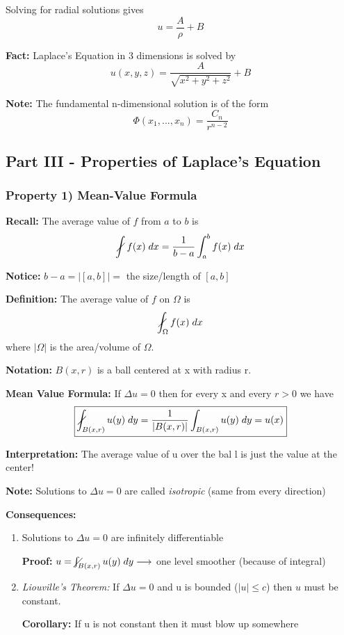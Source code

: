 \documentclass[12pt]{article}
\newcommand{\slashedint}{\diagup \!\!\!\!\!\!\! \int}
\begin{document}
Solving for radial solutions gives 
\[u = \frac{A}{\rho} + B\]

\textbf{Fact:} Laplace's Equation in 3 dimensions is solved by 
\[\boxed{u(x, y, z) = \frac{A}{\sqrt{x^2 + y^2 + z^2}} + B}\]

\textbf{Note:} The fundamental n-dimensional solution is of the form 
\[\Phi(x_1, ..., x_n) = \frac{C_n}{r^{n-2}}\]

\subsection*{Part III - Properties of Laplace's Equation}
\subsubsection*{Property 1) Mean-Value Formula}
\textbf{Recall:} The average value of $f$ from $a$ to $b$ is 
\[\slashedint f(x)\; dx = \frac{1}{b - a}\int_a^b f(x)\; dx\]

\textbf{Notice:} $b - a = |[a, b]| = $ the size/length of $[a, b]$

\textbf{Definition:} The average value of $f$ on $\Omega$ is 
\[ \slashedint_{\Omega} f(x)\; dx\]
where $|\Omega|$ is the area/volume of $\Omega$. 

\textbf{Notation:} $B(x, r)$ is a ball centered at x with radius r. 

\textbf{Mean Value Formula:} If $\Delta u = 0$ then for every x and every $r > 0$ we have 
\[\boxed{\slashedint_{B(x, r)} u(y)\; dy = \frac{1}{|B(x, r)|} \int_{B(x, r)} u(y) \; dy = u(x)}\]

\textbf{Interpretation:} The average value of u over the bal l is just the value at the center!

\textbf{Note:} Solutions to $\Delta u = 0$ are called \emph{isotropic} (same from every direction)

\textbf{Consequences:}
\begin{enumerate}
    \item Solutions to $\Delta u = 0$ are infinitely differentiable 
    
    \textbf{Proof:} $u = \slashedint_{B(x, r)} u(y)\;dy \longrightarrow$ one level smoother (because of integral)

    \item \emph{Liouville's Theorem:} If $\Delta u = 0$ and u is bounded ($|u|\leq c$) then $u$ must be constant. 
   
    \textbf{Corollary:} If u is not constant then it must blow up somewhere
\end{enumerate}
\end{document}
